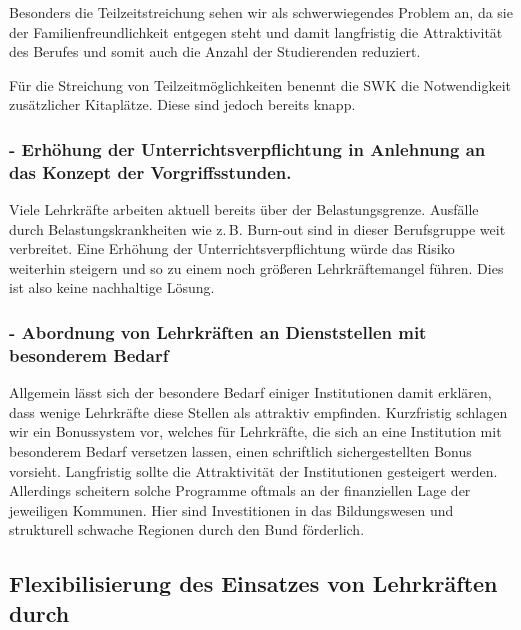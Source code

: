 \documentclass[DIV=calc]{scrartcl}
\begin{document}
Besonders die Teilzeitstreichung sehen wir als schwerwiegendes Problem an, da sie der Familienfreundlichkeit entgegen steht und damit langfristig die Attraktivität des Berufes und somit auch die Anzahl der Studierenden reduziert.

Für die Streichung von Teilzeitmöglichkeiten benennt die SWK die Notwendigkeit zusätzlicher Kitaplätze. Diese sind jedoch bereits knapp. 

\subsubsection*{- Erhöhung der Unterrichtsverpflichtung in Anlehnung an das Konzept der Vorgriffsstunden.}
Viele Lehrkräfte arbeiten aktuell bereits über der Belastungsgrenze. Ausfälle durch Belastungskrankheiten wie z.\,B. Burn-out sind in dieser Berufsgruppe weit verbreitet. Eine Erhöhung der Unterrichtsverpflichtung würde das Risiko weiterhin steigern und so zu einem noch größeren Lehrkräftemangel führen. Dies ist also keine nachhaltige Lösung.%

\subsubsection*{- Abordnung von Lehrkräften an Dienststellen mit besonderem Bedarf}

Allgemein lässt sich der besondere Bedarf einiger Institutionen damit erklären, dass wenige Lehrkräfte diese Stellen als attraktiv empfinden.
Kurzfristig schlagen wir ein Bonussystem vor, welches für Lehrkräfte, die sich an eine Institution mit besonderem Bedarf versetzen lassen, einen schriftlich sichergestellten Bonus vorsieht. Langfristig sollte die Attraktivität der Institutionen gesteigert werden.
Allerdings scheitern solche Programme oftmals an der finanziellen Lage der jeweiligen Kommunen. Hier sind Investitionen in das Bildungswesen und strukturell schwache Regionen durch den Bund förderlich. %

\subsection*{Flexibilisierung des Einsatzes von Lehrkräften durch}
\end{document}
